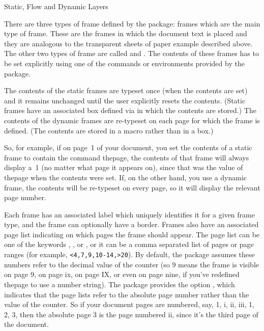 {%
}
{Static, Flow and Dynamic Layers}

There are three types of frame defined by the 
package:  frames
which are the main type of frame. These are the frames in which the
document text is placed and they are analogous to the transparent
sheets of paper example described above. The other two types of frame are
called  and .  The contents of these frames has
to be set explicitly using one of the commands or environments
provided by the  package.

The contents of the static frames are typeset once (when the
contents are set) and it remains unchanged until the user explicitly
resets the contents. (Static frames have an associated box defined
via  in which the contents are stored.) The contents
of the dynamic frames are re-typeset on each page for which the
frame is defined. (The contents are stored in a macro rather than in
a box.)

So, for example, if on page~1 of your document, you set the contents
of a static frame to contain the command \gls{thepage}, the
contents of that frame will always display a~1 (no matter what page
it appears on), since that was the value of \gls{thepage} when
the contents were set. If, on the other hand, you use a dynamic
frame, the contents will be re-typeset on every page, so it will
display the relevant page number.

Each frame has an associated label which uniquely identifies it for
a given frame type, and the frame can optionally have a border. Frames also
have an associated page list indicating on which pages the frame
should appear.  The page list can be one of the keywords
, ,  or , or it
can be a comma separated list of pages or page ranges (for example,
\verb|<4,7,9,10-14,>20|). By default, the  package
assumes these numbers refer to the decimal value of the
 counter (so 9 means the frame is visible on page 9, on
page ix, on page IX, or even on page nine, if you've redefined
\gls{thepage} to use a number string). The 
package provides the option , which indicates
that the page lists refer to the absolute page number rather than
the value of the  counter. So if your document pages
are numbered, say, 1, i, ii, iii, 1, 2, 3, then the absolute page 3
is the page numbered ii, since it's the third page of the document.


